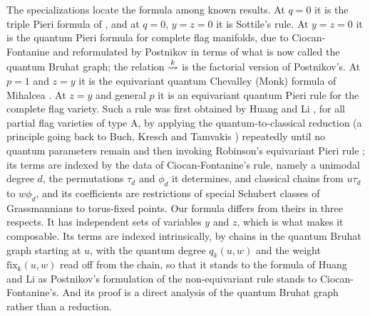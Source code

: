 \documentclass{amsart}
\theoremstyle{definition}
\theoremstyle{remark}
\numberwithin{equation}{section}
\newcommand{\xrightsquigarrow}[2][]{%
	\mathrel{\mathop{\rightsquigarrow}\limits^{\scriptstyle #2}%
	\ifx\hfuzz#1\hfuzz\else_{\scriptstyle #1}\fi}%
}
\newcommand{\tom}[1]{\ensuremath{\xrightsquigarrow{#1}}}
\newcommand{\fx}{\mathrm{fix}}
\begin{document}
\begin{enumerate}
The specializations locate the formula among known results. At $q=0$ it is the triple Pieri formula of \cite{samuelmolev}, and at $q=0$, $y=z=0$ it is Sottile's rule. At $y=z=0$ it is the quantum Pieri formula for complete flag manifolds, due to Ciocan-Fontanine \cite{ciocan1999partial} and reformulated by Postnikov \cite{postnikov1999quantum} in terms of what is now called the quantum Bruhat graph; the relation $\tom{k}$ is the factorial version of Postnikov's. At $p=1$ and $z=y$ it is the equivariant quantum Chevalley (Monk) formula of Mihalcea \cite{mihalcea2007equivariant}. At $z=y$ and general $p$ it is an equivariant quantum Pieri rule for the complete flag variety. Such a rule was first obtained by Huang and Li \cite[Theorem~3.10]{huang2015equivariant}, for all partial flag varieties of type A, by applying the quantum-to-classical reduction (a principle going back to Buch, Kresch and Tamvakis \cite{buch2003gwgrass}) repeatedly until no quantum parameters remain and then invoking Robinson's equivariant Pieri rule \cite{robinsonpieri}; its terms are indexed by the data of Ciocan-Fontanine's rule, namely a unimodal degree $d$, the permutations $\tau_d$ and $\phi_d$ it determines, and classical chains from $u\tau_d$ to $w\phi_d$, and its coefficients are restrictions of special Schubert classes of Grassmannians to torus-fixed points. Our formula differs from theirs in three respects. It has independent sets of variables $y$ and $z$, which is what makes it composable. Its terms are indexed intrinsically, by chains in the quantum Bruhat graph starting at $u$, with the quantum degree $q_k(u,w)$ and the weight $\fx_k(u,w)$ read off from the chain, so that it stands to the formula of Huang and Li as Postnikov's formulation of the non-equivariant rule stands to Ciocan-Fontanine's. And its proof is a direct analysis of the quantum Bruhat graph rather than a reduction.


\end{enumerate}
\end{document}
